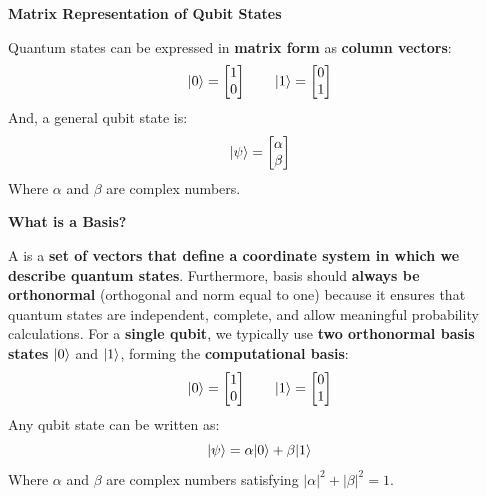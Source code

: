 \begin{flushleft}
    \textcolor{Green3}{ \textbf{Matrix Representation of Qubit States}}
\end{flushleft}
Quantum states can be expressed in \textbf{matrix form} as \textbf{column vectors}:
\begin{equation*}
    | 0 \rangle = \begin{bmatrix}
        1 \\ 0
    \end{bmatrix}
    \hspace{2em}
    | 1 \rangle = \begin{bmatrix}
        0 \\ 1
    \end{bmatrix}
\end{equation*}
And, a general qubit state is:
\begin{equation*}
    | \psi \rangle = \begin{bmatrix}
        \alpha \\ \beta
    \end{bmatrix}
\end{equation*}
Where $\alpha$ and $\beta$ are complex numbers.

\highspace
\begin{flushleft}
    \textcolor{Green3}{ \textbf{What is a Basis?}}
\end{flushleft}
A  is a \textbf{set of vectors that define a coordinate system in which we describe quantum states}. Furthermore, basis should \textbf{always be orthonormal} (orthogonal and norm equal to one) because it ensures that quantum states are independent, complete, and allow meaningful probability calculations. For a \textbf{single qubit}, we typically use \textbf{two orthonormal basis states} $| 0 \rangle$ and $| 1 \rangle$, forming the \textbf{computational basis}:
\begin{equation*}
    | 0 \rangle = \begin{bmatrix}1\\0\end{bmatrix}
    \hspace{2em}
    | 1 \rangle = \begin{bmatrix}0\\1\end{bmatrix}
\end{equation*}
Any qubit state can be written as:
\begin{equation*}
    | \psi \rangle = \alpha | 0 \rangle + \beta | 1 \rangle
\end{equation*}
Where $\alpha$ and $\beta$ are complex numbers satisfying $\left|\alpha\right|^{2} + \left|\beta\right|^{2} = 1$.

